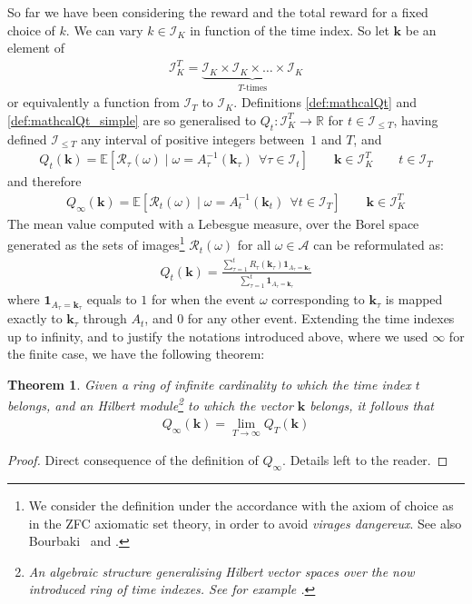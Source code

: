 \documentclass[]{scrartcl}
\newtheorem{theorem}{Theorem}[section]
\theoremstyle{definition}
\begin{document}
So far we have been considering the reward and the total reward for a fixed choice of $k$. We can vary $k\in \mathcal{I}_K$ in function of the time index. So let $\mathbf{k}$ be an element of
\begin{align*}
\mathcal{I}_K^T = \underbrace{\mathcal{I}_K\times \mathcal{I}_K \times \dots \times \mathcal{I}_K}_{T\text{-times}}
\end{align*}
or equivalently a function from $\mathcal{I}_T$ to $\mathcal{I}_K$.
Definitions \ref{def:mathcalQt} and \ref{def:mathcalQt_simple} are so generalised to $Q_t:\mathcal{I}_K^T \rightarrow \mathbb{R}$ for $t\in\mathcal{I}_{\leq T}$, having defined $\mathcal{I}_{\leq T}$ any interval of positive integers between~$1$ and $T$, and
\begin{align*}
Q_t(\mathbf{k}) = \mathbb{E} \left[ \mathcal{R}_{\tau}(\omega)
\mid
\omega = A^{-1}_{\tau}(\mathbf{k}_{\tau})~~ \forall \tau \in \mathcal{I}_t \right]
\qquad
\mathbf{k} \in \mathcal{I}_K^T
\qquad
t \in \mathcal{I}_T
\end{align*}
and therefore
\begin{align*}
Q_{\infty}(\mathbf{k}) = \mathbb{E} \left[ \mathcal{R}_{t}(\omega)
\mid
\omega = A^{-1}_{t}(\mathbf{k}_{t})~~ \forall t \in \mathcal{I}_T \right]
\qquad
\mathbf{k} \in \mathcal{I}_K^T
\end{align*}
The mean value computed with a Lebesgue measure, over the Borel space generated as the sets of images\footnote{
    We consider the definition under the accordance with the axiom of choice as in the ZFC axiomatic set theory, in order to avoid \emph{virages dangereux}. See also Bourbaki~\cite{bourbaki2004theory} and \cite{takeuti1982classes}.
} $\mathcal{R}_t(\omega)$ for all $\omega \in \mathcal{A}$ can be reformulated as:
\begin{align*}
Q_t(\mathbf{k})
=
\frac
{\sum_{\tau=1}^{t} R_{\tau}(\mathbf{k}_{\tau}) \mathbf{1}_{A_\tau = \mathbf{k}_{\tau}}}
{\sum_{\tau=1}^{t} \mathbf{1}_{A_\tau = \mathbf{k}_{\tau}}}
\end{align*}
where $\mathbf{1}_{A_\tau = \mathbf{k}_{\tau}}$ equals to $1$ for when the event $\omega$ corresponding to $\mathbf{k}_{\tau}$ is mapped exactly to $\mathbf{k}_{\tau}$ through $A_t$, and $0$ for any other event.
Extending the time indexes up to infinity, and to justify the notations introduced above, where we used $\infty$ for the finite case, we have the following theorem:
\begin{theorem}\label{th:bourbaki}
Given a ring of infinite cardinality to which the time index $t$ belongs, and an Hilbert module\footnote{An algebraic structure generalising Hilbert vector spaces over the now introduced ring of time indexes. See for example \cite{bourbaki1987topological}.} to which the vector $\mathbf{k}$ belongs, it follows that
\begin{align*}
Q_{\infty}(\mathbf{k}) = \lim_{T \rightarrow \infty} Q_{T}(\mathbf{k})
\end{align*}
\end{theorem}
\begin{proof}
    Direct consequence of the definition of $Q_{\infty}$. Details left to the reader.
\end{proof}
\end{document}
